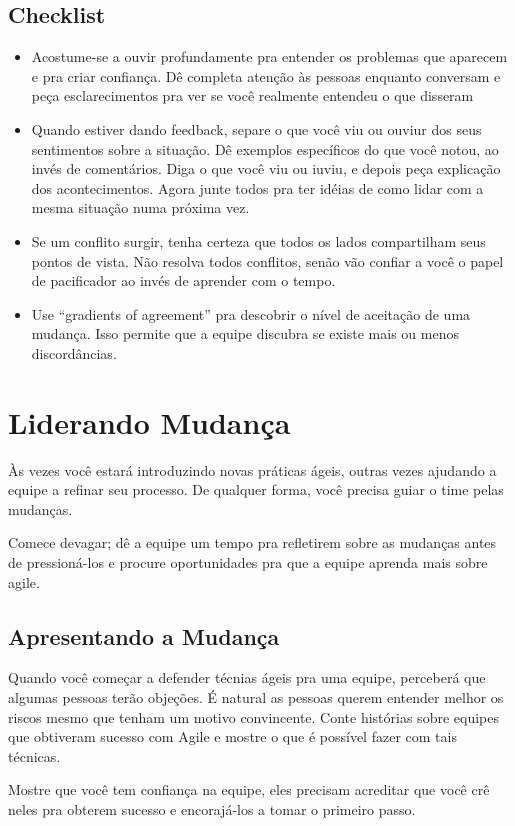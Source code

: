 \documentclass[a4paper, 10pt, font=plain]{abnt}
\begin{document}
\section{Checklist}
\begin{itemize}
\item Acostume-se a ouvir profundamente pra entender os problemas que aparecem e pra criar confiança. Dê completa atenção às pessoas enquanto conversam e peça esclarecimentos pra ver se você realmente entendeu o que disseram
\item Quando estiver dando feedback, separe o que você viu ou ouviur dos seus sentimentos sobre a situação. Dê exemplos específicos do que você notou, ao invés de comentários. Diga o que você viu ou iuviu, e depois peça explicação dos acontecimentos. Agora junte todos pra ter idéias de como lidar com a mesma situação numa próxima vez.
\item Se um conflito surgir, tenha certeza que todos os lados compartilham seus pontos de vista. Não resolva todos conflitos, senão vão confiar a você o papel de pacificador ao invés de aprender com o tempo.
\item Use ``gradients of agreement'' pra descobrir o nível de aceitação de uma mudança. Isso permite que a equipe discubra se existe mais ou menos discordâncias.
\end{itemize}


\chapter{Liderando Mudança}
Às vezes você estará introduzindo novas práticas ágeis, outras vezes ajudando a equipe a refinar seu processo. De qualquer forma, você precisa guiar o time pelas mudanças.

Comece devagar; dê a equipe um tempo pra refletirem sobre as mudanças antes de pressioná-los e procure oportunidades pra que a equipe aprenda mais sobre agile.

\section{Apresentando a Mudança}
Quando você começar a defender técnias ágeis pra uma equipe, perceberá que algumas pessoas terão objeções. É natural as pessoas querem entender melhor os riscos mesmo que tenham um motivo convincente. Conte histórias sobre equipes que obtiveram sucesso com Agile e mostre o que é possível fazer com tais técnicas.

Mostre que você tem confiança na equipe, eles precisam acreditar que você crê neles pra obterem sucesso e encorajá-los a tomar o primeiro passo.
\end{document}
